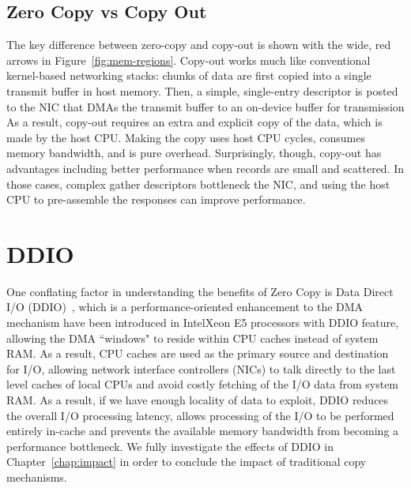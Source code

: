 \subsection{Zero Copy vs Copy Out}
The key difference between zero-copy and copy-out is shown with the wide, red
arrows in Figure~\ref{fig:mem-regions}. Copy-out works much like conventional
kernel-based networking stacks: chunks of data are first copied into a single
transmit buffer in host memory. Then, a simple, single-entry descriptor is
posted to the NIC that DMAs the transmit buffer to an on-device buffer for transmission
As a result, copy-out requires an extra and explicit copy of the data, which is made
by the host CPU.  Making the copy uses host CPU cycles, consumes memory
bandwidth, and is pure overhead. Surprisingly, though, copy-out has
advantages including better performance when
records are small and scattered.  In those cases, complex gather descriptors
bottleneck the NIC, and using the host CPU to pre-assemble the responses can
improve performance.



\section{DDIO}
One conflating factor in understanding the benefits of Zero Copy is Data Direct I/O (DDIO)~\cite{ddio}, which is a performance-oriented enhancement 
to the DMA mechanism have been introduced in Intel\textregistered Xeon E5 processors with DDIO feature,
allowing the DMA ``windows" to reside within CPU caches instead of system RAM. As a result,
CPU caches are used as the primary source and destination for I/O, 
allowing network interface controllers (NICs) to talk directly to the last level caches of local CPUs
and avoid costly fetching of the I/O data from system RAM. As a result, if we have enough locality of data to exploit,
DDIO reduces the overall I/O processing latency, allows processing of the I/O 
to be performed entirely in-cache and prevents the available memory bandwidth from becoming a performance bottleneck.
We fully investigate the effects of DDIO in Chapter~\ref{chap:impact} in order to conclude the impact of 
traditional copy mechanisms.


